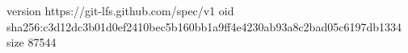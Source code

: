 version https://git-lfs.github.com/spec/v1
oid sha256:c3d12dc3b01d0ef2410bec5b160bb1a9ff4e4230ab93a8c2bad05c6197db1334
size 87544
